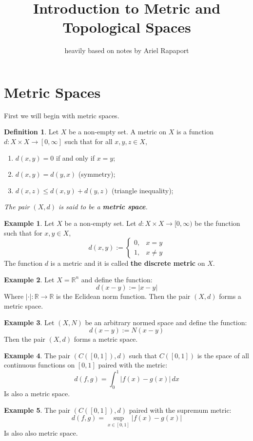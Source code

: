 \documentclass[11pt,a4paper]{article}
\title{\textbf{Introduction to Metric and Topological Spaces}}
\author{heavily based on notes by Ariel Rapaport}
\date{}
\theoremstyle{definition}
\newtheorem{definition}{Definition}[section]
\newtheorem{example}{Example}[section]
\theoremstyle{plain}
\newcommand{\R}{\mathbb{R}}
\newcommand{\abs}[1]{\left\lvert #1\right\rvert}
\begin{document}
	\maketitle
	\newpage
	\section{Metric Spaces}
	First we will begin with metric spaces.
	\begin{definition}
	Let $X$ be a non-empty set. A metric on $X$ is a function 
	$d \colon X \times X \to [0,\infty]$ such that for all $x,y,z \in X$,
	\end{definition}
	\begin{enumerate}
	\item $d(x,y) = 0$ if and only if $x = y$;
	\item $d(x,y) = d(y,x)$ (symmetry);
	\item $d(x,z) \le d(x,y) + d(y,z)$ (triangle inequality);
	\end{enumerate}
	\emph{The pair $(X,d)$ is said to be a \textbf{metric space}.}
	\begin{example}
	Let $X$ be a non-empty set. Let $d \colon X \times X \to [0,\infty)$ be
	the function such that for $x,y \in X$,
	\[
		d(x,y) := \begin{cases}
			0, & x=y \\
			1, & x \neq y
		\end{cases}
	\]
	The function $d$ is a metric and it is called \textbf{the discrete metric}
	on $X$.
	\end{example}
	\begin{example}
	Let $X = \R^n$ and define the function:
	\[
		d(x - y) := \abs{x - y}
	\]
	Where $|\cdot | \colon \R \to \R$ is the Eclidean norm function. 
	Then the pair $(X, d)$ forms a metric space.
	\end{example}
	\begin{example}
	Let $(X, N)$ be an arbitrary normed space and define the function:
	\[
		d(x-y) := N(x - y)
	\] 
	Then the pair $(X, d)$ forms a metric space.
	\end{example}
	\begin{example}
	The pair $(C([0,1]), d)$ such that $C([0,1])$ is the space of all
	continuous functions on $[0,1]$ paired with the metric:
	\[
		d(f,g) = \int_{0}^{1}{\abs{f(x) - g(x)}\,dx}
	\]
	Is also a metric space.
	\end{example}
	\begin{example}
	The pair $(C([0,1]), d)$ paired with the supremum metric:
	\[
		d(f,g) = \sup_{x \in [0,1]}{|f(x) - g(x)|}
	\]
	Is also also metric space.
	\end{example}
\end{document}
